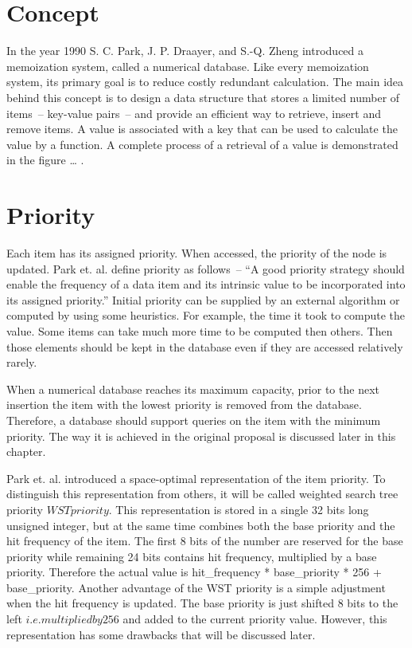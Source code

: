 

\section{Concept}
In the year 1990 S. C. Park, J. P. Draayer, and S.-Q. Zheng introduced a memoization system, called a numerical database. Like every memoization system, its primary goal is to reduce costly redundant calculation. The main idea behind this concept is to design a data structure that stores a limited number of items~-- key-value pairs~-- and provide an efficient way to retrieve, insert and remove items. A value is associated with a key that can be used to calculate the value by a function. A complete process of a retrieval of a value is demonstrated in the figure … .

\section{Priority}

Each item has its assigned priority. When accessed, the priority of the node is updated. Park et. al. define priority as follows~-- “A good priority strategy should enable the frequency of a data item and its intrinsic value to be incorporated into its assigned priority.” Initial priority can be supplied by an external algorithm or computed by using some heuristics. For example, the time it took to compute the value. Some items can take much more time to be computed then others. Then those elements should be kept in the database even if they are accessed relatively rarely.

When a numerical database reaches its maximum capacity, prior to the next insertion the item with the lowest priority is removed from the database. Therefore, a database should support queries on the item with the minimum priority. The way it is achieved in the original proposal is discussed later in this chapter.

Park et. al. introduced a space-optimal representation of the item priority. To distinguish this representation from others, it will be called weighted search tree priority \(WST priority\). This representation is stored in a single 32 bits long unsigned integer, but at the same time combines both the base priority and the hit frequency of the item. The first 8 bits of the number are reserved for the base priority while remaining 24 bits contains hit frequency, multiplied by a base priority.
Therefore the actual value is hit\_frequency * base\_priority * 256 + base\_priority. Another advantage of the WST priority is a simple adjustment when the hit frequency is updated. The base priority is just shifted 8 bits to the left \(i.e. multiplied by 256\) and added to the current priority value. However, this representation has some drawbacks that will be discussed later.

